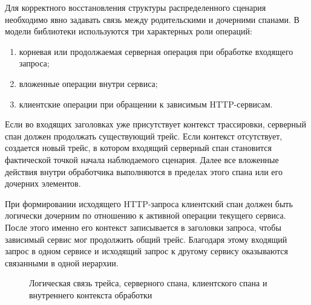 Для корректного восстановления структуры распределенного сценария необходимо явно
задавать связь между родительскими и дочерними спанами. В модели библиотеки
используются три характерных роли операций:
\begin{enumerate}
    \item корневая или продолжаемая серверная операция при обработке входящего запроса;
    \item вложенные операции внутри сервиса;
    \item клиентские операции при обращении к зависимым HTTP-сервисам.
\end{enumerate}

Если во входящих заголовках уже присутствует контекст трассировки, серверный спан
должен продолжать существующий трейс. Если контекст отсутствует, создается новый
трейс, в котором входящий серверный спан становится фактической точкой начала
наблюдаемого сценария. Далее все вложенные действия внутри обработчика выполняются
в пределах этого спана или его дочерних элементов.

При формировании исходящего HTTP-запроса клиентский спан должен быть логически
дочерним по отношению к активной операции текущего сервиса. После этого именно его
контекст записывается в заголовки запроса, чтобы зависимый сервис мог продолжить
общий трейс. Благодаря этому входящий запрос в одном сервисе и исходящий запрос к
другому сервису оказываются связанными в одной иерархии.

\begin{figure}[H]
    \centering
    \caption{Логическая связь трейса, серверного спана, клиентского спана и внутреннего контекста обработки}
    \label{fig:trace-model}
\end{figure}

